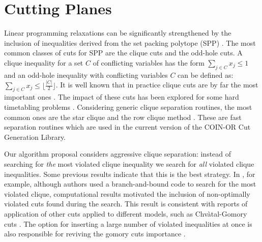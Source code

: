 \documentclass{endm}
\begin{document}
\section{Cutting Planes}\label{cut}

Linear programming relaxations can be significantly strengthened by the inclusion of inequalities derived from the set packing polytope (SPP) \cite {Padberg1973}. The most common classes of cuts for SPP are the clique cuts and the odd-hole cuts. A clique inequality for a set $C$ of conflicting variables has the form $\sum_{j\in C}x_{j} \leq 1$ and an odd-hole inequality with conflicting variables $C$ can be defined as: $\sum_{j\in C}x_{j} \leq \lfloor \frac{|C|}{2}\rfloor$. It is well known that in practice clique cuts are by far the most important ones \cite{Borndorfer1998}. The impact of these cuts has been explored for some hard timetabling problems \cite{Avella2005,Marecek2012}. Considering generic clique separation routines, the most common ones are the star clique and the row clique method \cite{Eso1999a,Hoffman1993,Borndorfer1998}. These are fast separation routines which are used in the current version of the COIN-OR Cut Generation Library.  

Our algorithm proposal considers aggressive clique separation: instead of searching for \emph{the} most violated clique inequality we search for \emph{all} violated clique inequalities. Some previous results indicate that this is the best strategy. In \cite{Marecek2012}, for example, although authors used a branch-and-bound code to search for the most violated clique, computational results motivated the inclusion of non-optimally violated cuts found during the search. This result is consistent with reports of application of other cuts applied to different models, such as {C}hv\`{a}tal-Gomory cuts \cite{Fischetti2007}. The option for inserting a large number of violated inequalities at once is also responsible for reviving the gomory cuts importance \cite {Cornuejols2007}.
\end{document}
